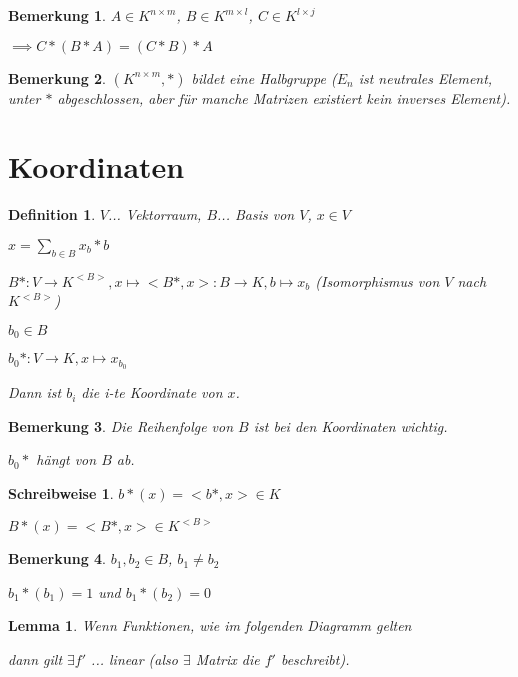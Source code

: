 \documentclass[twocolumn]{article}
\newtheorem{lemma}[theorem]{Lemma}
\newtheorem{definition}{Definition}[section]
\newtheorem*{remark}{Bemerkung}
\newtheorem*{schreibweise}{Schreibweise}
\begin{document}
\begin{remark}
	$A \in K^{n \times m}$, $B \in K^{m \times l}$, $C \in K^{l\times j}$
	
	$\implies C*(B*A) = (C*B)*A$
\end{remark}

\begin{remark}
	$(K^{n \times m},*)$ bildet eine Halbgruppe ($E_n$ ist neutrales Element, unter $*$ abgeschlossen, aber für manche Matrizen existiert kein inverses Element).
\end{remark}

\section{Koordinaten}
\begin{definition}
	$V$... Vektorraum, $B$... Basis von $V$, $x \in V$
	
	$x = \sum_{b \in B}x_b * b$
	
	$B* : V \rightarrow K^{<B>}, x \mapsto <B*,x> : B \rightarrow K, b \mapsto x_b$ (Isomorphismus von $V$ nach $K^{<B>}$)
	
	$b_0 \in B$
	
	$b_0* : V \rightarrow K, x \mapsto x_{b_0}$
	
	Dann ist $b_i$ die i-te Koordinate von $x$.
	
\end{definition}

\begin{remark}
	Die Reihenfolge von $B$ ist bei den Koordinaten wichtig.
	
	$b_0*$ hängt von $B$ ab.
\end{remark}

\begin{schreibweise}
	$b*(x) = <b*,x> \in K$
	
	$B*(x) = <B*,x> \in K^{<B>}$
\end{schreibweise}

\begin{remark}
	$b_1,b_2 \in B$, $b_1 \neq b_2$
	
	$b_1*(b_1)=1$ und $b_1*(b_2)=0$
\end{remark}

\begin{lemma}
	Wenn Funktionen, wie im folgenden Diagramm gelten

	dann gilt $\exists f'$ ... linear (also $\exists$ Matrix die $f'$ beschreibt).
\end{lemma}
\end{document}
